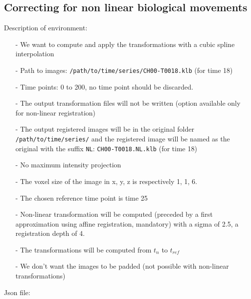 \documentclass[10pt,a4paper]{book}
\begin{document}
\subsection{Correcting for non linear biological movements}
Description of environment:
\begin{itemize}
\item[-] We want to compute and apply the transformations with a cubic spline interpolation
\item[-] Path to images: \texttt{/path/to/time/series/CH00-T0018.klb} (for time 18)
\item[-] Time points: 0 to 200, no time point should be discarded.
\item[-] The output transformation files will not be written (option available only for non-linear registration)
\item[-] The output registered images will be in the original folder \texttt{/path/to/time/series/} and the registered image will be named as the original with the suffix \texttt{NL}: \texttt{CH00-T0018.NL.klb} (for time 18)
\item[-] No maximum intensity projection
\item[-] The voxel size of the image in x, y, z is respectively 1, 1, 6.
\item[-] The chosen reference time point is time 25
\item[-] Non-linear transformation will be computed (preceded by a first approximation using affine registration, mandatory) with a sigma of 2.5, a registration depth of 4.
\item[-] The transformations will be computed from $t_n$ to $t_{ref}$
\item[-] We don't want the images to be padded (not possible with non-linear transformations)
\end{itemize}
Json file:
\end{document}
